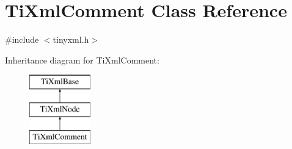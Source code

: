 \hypertarget{classTiXmlComment}{
\section{\-Ti\-Xml\-Comment \-Class \-Reference}
\label{de/d43/classTiXmlComment}
}


{\ttfamily \#include $<$tinyxml.\-h$>$}

\-Inheritance diagram for \-Ti\-Xml\-Comment\-:\begin{figure}[H]
\begin{center}
\leavevmode
\includegraphics[height=3.000000cm]{de/d43/classTiXmlComment}
\end{center}
\end{figure}
